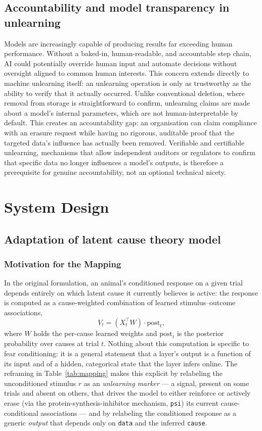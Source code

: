 \documentclass{surreydissertation}
\begin{document}
\section{Accountability and model transparency in unlearning}
Models are increasingly capable of producing results far exceeding human performance. Without a baked-in, human-readable, and accountable step chain, AI could potentially override human input and automate decisions without oversight aligned to common human interests. This concern extends directly to machine unlearning itself: an unlearning operation is only as trustworthy as the ability to verify that it actually occurred. Unlike conventional deletion, where removal from storage is straightforward to confirm, unlearning claims are made about a model's internal parameters, which are not human-interpretable by default. This creates an accountability gap: an organisation can claim compliance with an erasure request while having no rigorous, auditable proof that the targeted data's influence has actually been removed. Verifiable and certifiable unlearning, mechanisms that allow independent auditors or regulators to confirm that specific data no longer influences a model's outputs, is therefore a prerequisite for genuine accountability, not an optional technical nicety.

\chapter{System Design}
\section{Adaptation of latent cause theory model}
\subsection{Motivation for the Mapping}
 
In the original formulation, an animal's conditioned response on a given
trial depends entirely on which latent cause it currently believes is
active: the response is computed as a cause-weighted combination of
learned stimulus--outcome associations,
\[
V_t = \left(X_t^\top W\right) \cdot \mathrm{post}_t,
\]
where $W$ holds the per-cause learned weights and $\mathrm{post}_t$ is the
posterior probability over causes at trial $t$. Nothing about this
computation is specific to fear conditioning: it is a general statement
that a layer's output is a function of its input and of a hidden,
categorical state that the layer infers online. The reframing in
Table~\ref{tab:mapping} makes this explicit by relabeling the unconditioned
stimulus $r$ as an \emph{unlearning marker} --- a signal, present on some
trials and absent on others, that drives the model to either reinforce or
actively erase (via the protein-synthesis-inhibitor mechanism, \texttt{psi})
its current cause-conditional associations --- and by relabeling the
conditioned response as a generic \emph{output} that depends only on
\texttt{data} and the inferred \texttt{cause}.
 
\end{document}
